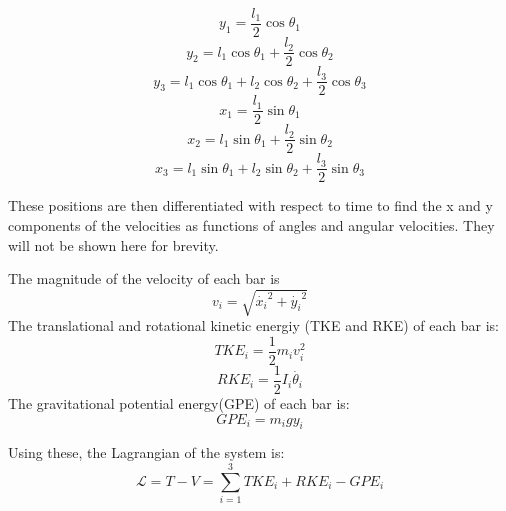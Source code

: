 \begin{equation}
y_1 = \frac{l_1}{2}\cos \theta_1
\end{equation}
\begin{equation}
y_2 = l_1\cos \theta _1 + \frac{l_2}{2}\cos \theta_2
\end{equation}
\begin{equation}
y_3 = l_1\cos \theta _1 + l_2\cos \theta_2 + \frac{l_3}{2} \cos \theta _3
\end{equation}
\begin{equation}
x_1 = \frac{l_1}{2}\sin \theta_1
\end{equation}
\begin{equation}
x_2 = l_1\sin \theta _1 + \frac{l_2}{2}\sin \theta_2
\end{equation}
\begin{equation}
x_3 = l_1\sin \theta _1 + l_2\sin \theta_2 + \frac{l_3}{2} \sin \theta _3
\end{equation}

These positions are then differentiated with respect to time to find the x and y components of the velocities as functions of angles and angular velocities. They will not be shown here for brevity.

The magnitude of the velocity of each bar is
\begin{equation}
v_i = \sqrt{\dot{x_i}^2+\dot{y_i}^2}
\end{equation}
The translational and rotational kinetic energiy (TKE and RKE) of each bar is:
\begin{equation}
TKE_i = \frac{1}{2}m_iv_i^2
\end{equation}
\begin{equation}
RKE_i = \frac{1}{2}I_i\dot{\theta_i}
\end{equation}
The gravitational potential energy(GPE) of each bar is:
\begin{equation}
GPE_i = m_igy_i
\end{equation}

Using these, the Lagrangian of the system is:
\begin{equation}
\mathcal{L} = T-V = \displaystyle\sum_{i=1}^{3} TKE_i+RKE_i-GPE_i
\label{lagrangian}
\end{equation}

